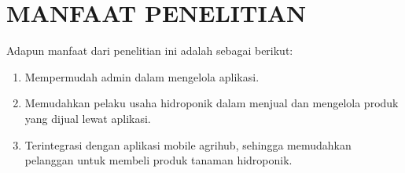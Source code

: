 \section{\uppercase{MANFAAT PENELITIAN}}
Adapun manfaat dari penelitian ini adalah sebagai berikut:
\begin{enumerate}
	\item Mempermudah admin dalam mengelola aplikasi.
	\item Memudahkan pelaku usaha hidroponik dalam menjual dan mengelola produk yang dijual lewat aplikasi.
	\item Terintegrasi dengan aplikasi mobile agrihub, sehingga memudahkan pelanggan untuk membeli produk tanaman hidroponik.
	
\end{enumerate}

\begin{comment}

\end{comment}